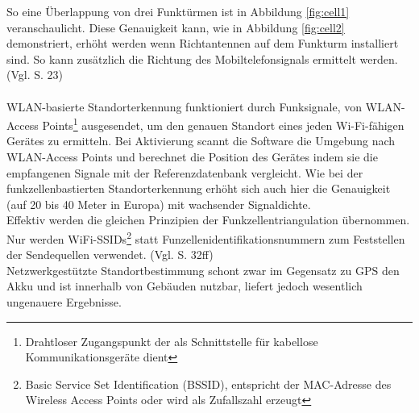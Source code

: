So eine Überlappung von drei Funktürmen ist in Abbildung \ref{fig:cell1} veranschaulicht. Diese Genauigkeit kann, wie in Abbildung \ref{fig:cell2} demonstriert, erhöht werden wenn Richtantennen auf dem Funkturm installiert sind. So kann zusätzlich die Richtung des Mobiltelefonsignals ermittelt werden. (Vgl. \cite{gps} S. 23) \\\\
\gls{WLAN}-basierte Standorterkennung funktioniert durch Funksignale, von \gls{WLAN}-Access Points\footnote{ Drahtloser Zugangspunkt der als Schnittstelle für kabellose Kommunikationsgeräte dient} ausgesendet, um den genauen Standort eines jeden Wi-Fi-fähigen Gerätes zu ermitteln. Bei Aktivierung scannt die Software die Umgebung nach \gls{WLAN}-Access Points und berechnet die Position des Gerätes indem sie die empfangenen Signale mit der Referenzdatenbank vergleicht. Wie bei der funkzellenbastierten Standorterkennung erhöht sich auch hier die Genauigkeit (auf 20 bis 40 Meter in Europa) mit wachsender Signaldichte. \\
Effektiv werden die gleichen Prinzipien der Funkzellentriangulation übernommen. Nur werden WiFi-SSIDs\footnote{ Basic Service Set Identification (BSSID), entspricht der MAC-Adresse des Wireless Access Points oder wird als Zufallszahl erzeugt} statt Funzellenidentifikationsnummern zum Feststellen der Sendequellen verwendet. (Vgl. \cite{gps} S. 32ff) \\
Netzwerkgestützte Standortbestimmung schont zwar im Gegensatz zu \gls{GPS} den Akku und ist innerhalb von Gebäuden nutzbar, liefert jedoch wesentlich ungenauere Ergebnisse.
